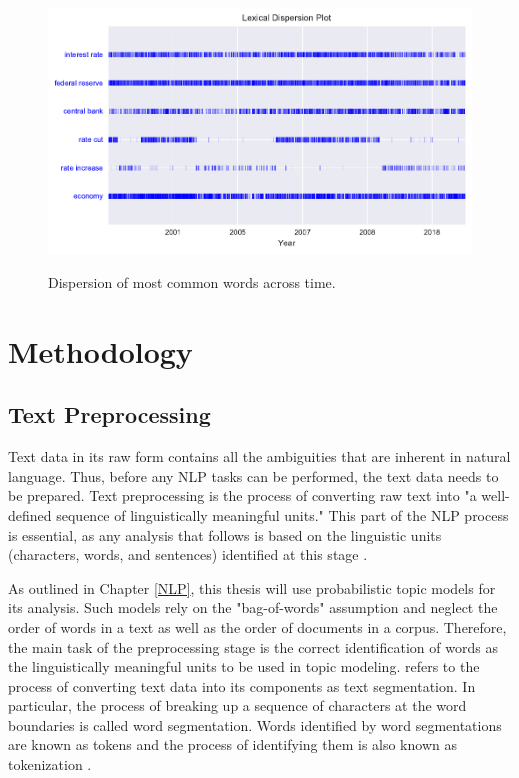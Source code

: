 \documentclass[11pt,a4paper,english,oneside]{book}
\numberwithin{equation}{chapter}
\begin{document}
\begin{figure}
	\caption{Dispersion of most common words across time.}
	\centering
	\includegraphics[scale=1]{Images/dispersionplot1.pdf}
	\label{dispersion}
\end{figure}

	


\section{Methodology}


\subsection{Text Preprocessing}\label{preprocessing}
Text data in its raw form contains all the ambiguities that are inherent in natural language. Thus, before any NLP tasks can be performed, the text data needs to be prepared. Text preprocessing is the process of converting raw text into "a well-defined sequence of linguistically meaningful units." This part of the NLP process is essential, as any analysis that follows is based on the linguistic units (characters, words, and sentences) identified at this stage \cite[p. 9]{Palmer.2010}.

As outlined in Chapter \ref{NLP}, this thesis will use probabilistic topic models for its analysis. Such models rely on the "bag-of-words" assumption and neglect the order of words in a text as well as the order of documents in a corpus. Therefore, the main task of the preprocessing stage is the correct identification of words as the linguistically meaningful units to be used in topic modeling. \citet[p. 10]{Palmer.2010} refers to the process of converting text data into its components as text segmentation. In particular, the process of breaking up a sequence of characters at the word boundaries is called word segmentation. Words identified by word segmentations are known as tokens and the process of identifying them is also known as tokenization \citep[p. 10]{Palmer.2010}.
\end{document}
